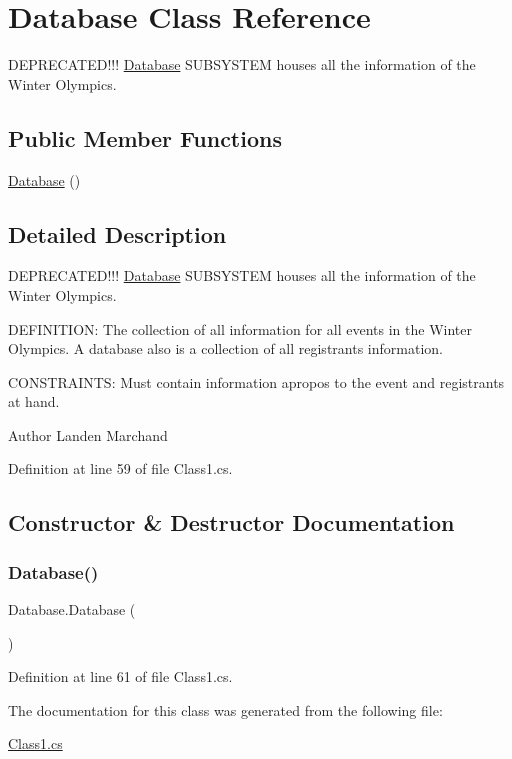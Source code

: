\hypertarget{classDatabase}{}\section{Database Class Reference}
\label{classDatabase}


D\+E\+P\+R\+E\+C\+A\+T\+E\+D!!! \hyperlink{classDatabase}{Database} S\+U\+B\+S\+Y\+S\+T\+EM houses all the information of the Winter Olympics.  


\subsection*{Public Member Functions}
\begin{DoxyCompactItemize}
\item 
\hyperlink{classDatabase_a2ed32b5fa1ed9b2591c32ddcda28e337}{Database} ()
\end{DoxyCompactItemize}


\subsection{Detailed Description}
D\+E\+P\+R\+E\+C\+A\+T\+E\+D!!! \hyperlink{classDatabase}{Database} S\+U\+B\+S\+Y\+S\+T\+EM houses all the information of the Winter Olympics. 

D\+E\+F\+I\+N\+I\+T\+I\+ON\+: The collection of all information for all events in the Winter Olympics. A database also is a collection of all registrants information.

C\+O\+N\+S\+T\+R\+A\+I\+N\+TS\+: Must contain information apropos to the event and registrants at hand.\begin{DoxyAuthor}{Author}
Landen Marchand 
\end{DoxyAuthor}


Definition at line 59 of file Class1.\+cs.



\subsection{Constructor \& Destructor Documentation}
\mbox{\label{classDatabase_a2ed32b5fa1ed9b2591c32ddcda28e337}} 
\subsubsection{\texorpdfstring{Database()}{Database()}}
{\footnotesize\ttfamily Database.\+Database (\begin{DoxyParamCaption}{ }\end{DoxyParamCaption})\hspace{0.3cm}{\ttfamily [inline]}}



Definition at line 61 of file Class1.\+cs.



The documentation for this class was generated from the following file\+:\begin{DoxyCompactItemize}
\item 
\hyperlink{Class1_8cs}{Class1.\+cs}\end{DoxyCompactItemize}
